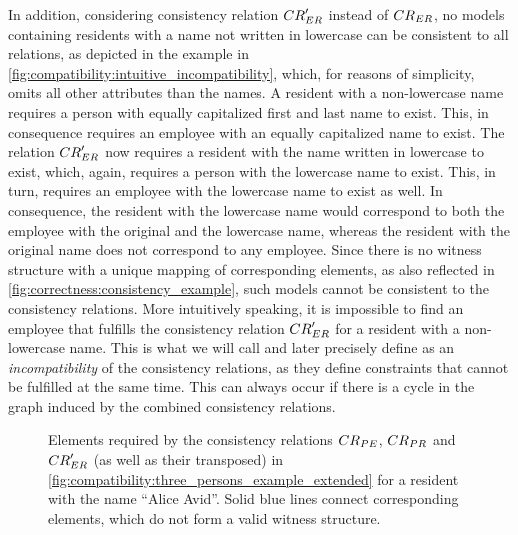 In addition, considering consistency relation $\consistencyrelation{CR}{ER}'$ instead of $\consistencyrelation{CR}{ER}$, no models containing residents with a name not written in lowercase can be consistent to all relations, as depicted in the example in \autoref{fig:compatibility:intuitive_incompatibility}, which, for reasons of simplicity, omits all other attributes than the names.
A resident with a non-lowercase name requires a person with equally capitalized first and last name to exist.
This, in consequence requires an employee with an equally capitalized name to exist.
The relation $\consistencyrelation{CR}{ER}'$ now requires a resident with the name written in lowercase to exist, which, again, requires a person with the lowercase name to exist.
This, in turn, requires an employee with the lowercase name to exist as well.
In consequence, the resident with the lowercase name would correspond to both the employee with the original and the lowercase name, whereas the resident with the original name does not correspond to any employee.
Since there is no witness structure with a unique mapping of corresponding elements, as also reflected in \autoref{fig:correctness:consistency_example}, such models cannot be consistent to the consistency relations.
More intuitively speaking, it is impossible to find an employee that fulfills the consistency relation $\consistencyrelation{CR}{ER}'$ for a resident with a non-lowercase name.
This is what we will call and later precisely define as an \emph{incompatibility} of the consistency relations, as they define constraints that cannot be fulfilled at the same time.
This can always occur if there is a cycle in the graph induced by the combined consistency relations.

\begin{figure}
    \centering
    
    \caption[Example for an intuitive notion of incompatibility]{Elements required by the consistency relations $\consistencyrelation{CR}{PE}$, $\consistencyrelation{CR}{PR}$ and $\consistencyrelation{CR}{ER}'$ (as well as their transposed) in \autoref{fig:compatibility:three_persons_example_extended} for a resident with the name \enquote{Alice Avid}. Solid blue lines connect corresponding elements, which do not form a valid witness structure.}
    \label{fig:compatibility:intuitive_incompatibility}
\end{figure}

